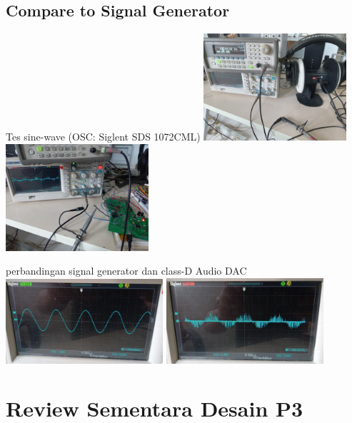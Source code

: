 \documentclass[table,dvipsnames]{beamer}
\begin{document}
	\begin{frame}
		\subsection{Compare to Signal Generator}
		\begin{exampleblock}{Tes sine-wave  (OSC: Siglent SDS 1072CML)}
			\includegraphics[width=150pt]{images/sine_sig_test}
			\includegraphics[width=150pt]{images/sine_sig_test_dac}
		\end{exampleblock}

		\begin{exampleblock}{perbandingan signal generator dan class-D Audio DAC}
			\includegraphics[width=165pt]{images/sine_sig_gen}
			\includegraphics[width=165pt]{images/sine_sig_dac}
		\end{exampleblock}
	\end{frame}

	\section {Review Sementara Desain P3}
\end{document}
